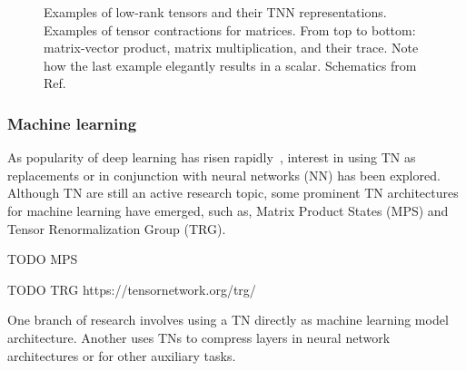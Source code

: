 \begin{figure}[htb]
    \centering
     \qquad
    
    \caption{\protect{} Examples of low-rank tensors and their TNN representations. \protect{} Examples of tensor contractions for matrices. From top to bottom: matrix-vector product, matrix multiplication, and their trace. Note how the last example elegantly results in a scalar. Schematics from Ref.~\cite{Stoudenmire2021}}
    \label{fig:tensor_diagrams}
\end{figure}



\subsubsection{Machine learning}

As popularity of deep learning has risen rapidly~\cite{DL_review}, interest in using TN as replacements or in conjunction with neural networks (NN) has been explored.
Although TN are still an active research topic, some prominent TN architectures for machine learning have emerged, such as, Matrix Product States (MPS) and Tensor Renormalization Group (TRG).

TODO MPS


TODO TRG https://tensornetwork.org/trg/


One branch of research involves using a TN directly as machine learning model architecture. Another uses TNs to compress layers in neural network architectures or for other auxiliary tasks.

